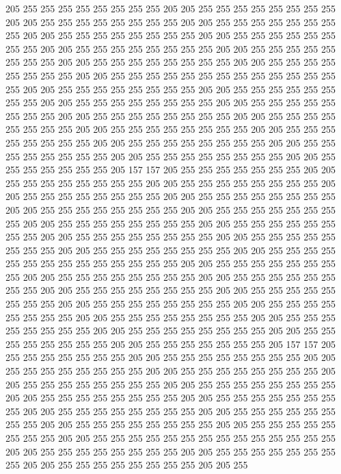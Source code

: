 205 255 255 255 255 255 255 255 255 205 205 255 255 255 255 255 255 255 255 205
205 255 255 255 255 255 255 255 255 205 205 255 255 255 255 255 255 255 255 205
205 255 255 255 255 255 255 255 255 205 205 255 255 255 255 255 255 255 255 205
205 255 255 255 255 255 255 255 255 205 205 255 255 255 255 255 255 255 255 205
205 255 255 255 255 255 255 255 255 205 205 255 255 255 255 255 255 255 255 205
205 255 255 255 255 255 255 255 255 255 255 255 255 255 255 205 205 255 255 255
255 255 255 255 255 205 205 255 255 255 255 255 255 255 255 205 205 255 255 255
255 255 255 255 255 205 205 255 255 255 255 255 255 255 255 205 205 255 255 255
255 255 255 255 255 205 205 255 255 255 255 255 255 255 255 205 205 255 255 255
255 255 255 255 255 205 205 255 255 255 255 255 255 255 255 205 205 255 255 255
255 255 255 255 255 205 205 255 255 255 255 255 255 255 255 205 205 255 255 255
255 255 255 255 255 205 205 255 255 255 255 255 255 255 205 157 157 205 255 255
255 255 255 255 255 205 205 255 255 255 255 255 255 255 255 205 205 255 255 255
255 255 255 255 255 205 205 255 255 255 255 255 255 255 255 205 205 255 255 255
255 255 255 255 255 205 205 255 255 255 255 255 255 255 255 205 205 255 255 255
255 255 255 255 255 205 205 255 255 255 255 255 255 255 255 205 205 255 255 255
255 255 255 255 255 205 205 255 255 255 255 255 255 255 255 205 205 255 255 255
255 255 255 255 255 205 205 255 255 255 255 255 255 255 255 205 205 255 255 255
255 255 255 255 255 255 255 255 255 255 255 205 205 255 255 255 255 255 255 255
255 205 205 255 255 255 255 255 255 255 255 205 205 255 255 255 255 255 255 255
255 205 205 255 255 255 255 255 255 255 255 205 205 255 255 255 255 255 255 255
255 205 205 255 255 255 255 255 255 255 255 205 205 255 255 255 255 255 255 255
255 205 205 255 255 255 255 255 255 255 255 205 205 255 255 255 255 255 255 255
255 205 205 255 255 255 255 255 255 255 255 205 205 255 255 255 255 255 255 255
255 205 205 255 255 255 255 255 255 255 205 157 157 205 255 255 255 255 255 255
255 205 205 255 255 255 255 255 255 255 255 205 205 255 255 255 255 255 255 255
255 205 205 255 255 255 255 255 255 255 255 205 205 255 255 255 255 255 255 255
255 205 205 255 255 255 255 255 255 255 255 205 205 255 255 255 255 255 255 255
255 205 205 255 255 255 255 255 255 255 255 205 205 255 255 255 255 255 255 255
255 205 205 255 255 255 255 255 255 255 255 205 205 255 255 255 255 255 255 255
255 205 205 255 255 255 255 255 255 255 255 205 205 255 255 255 255 255 255 255
255 255 255 255 255 255 255 205 205 255 255 255 255 255 255 255 255 205 205 255
255 255 255 255 255 255 255 205 205 255 255 255 255 255 255 255 255 205 205 255
